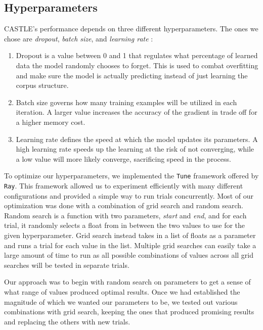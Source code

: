 \documentclass[nofilelist]{cslthse-msc}
\begin{document}
\subsection{Hyperparameters}
CASTLE's performance depends on three different hyperparameters. The ones we chose are \textit{dropout}, \textit{batch size}, and \textit{learning rate} \citep{hyperparameters}:
\begin{enumerate}
    \item Dropout is a value between 0 and 1 that regulates what percentage of learned data the model randomly chooses to forget. This is used to combat overfitting and make sure the model is actually predicting instead of just learning the corpus structure.
    \item  Batch size governs how many training examples will be utilized in each iteration. A larger value increases the accuracy of the gradient in trade off for a higher memory cost.
    \item  Learning rate defines the speed at which the model updates its parameters. A high learning rate speeds up the learning at the risk of not converging, while a low value will more likely converge, sacrificing speed in the process.
\end{enumerate}

To optimize our hyperparameters, we implemented the \texttt{Tune} framework offered by \texttt{Ray}. This framework allowed us to experiment efficiently with many different configurations and provided a simple way to run trials concurrently. Most of our optimization was done with a combination of grid search and random search. Random search is a function with two parameters, \textit{start} and \textit{end}, and for each trial, it randomly selects a float from in between the two values to use for the given hyperparameter. Grid search instead takes in a list of floats as a parameter and runs a trial for each value in the list. Multiple grid searches can easily take a large amount of time to run as all possible combinations of values across all grid searches will be tested in separate trials. 

Our approach was to begin with random search on parameters to get a sense of what range of values produced optimal results. Once we had established the magnitude of which we wanted our parameters to be, we tested out various combinations with grid search, keeping the ones that produced promising results and replacing the others with new trials.
\end{document}
